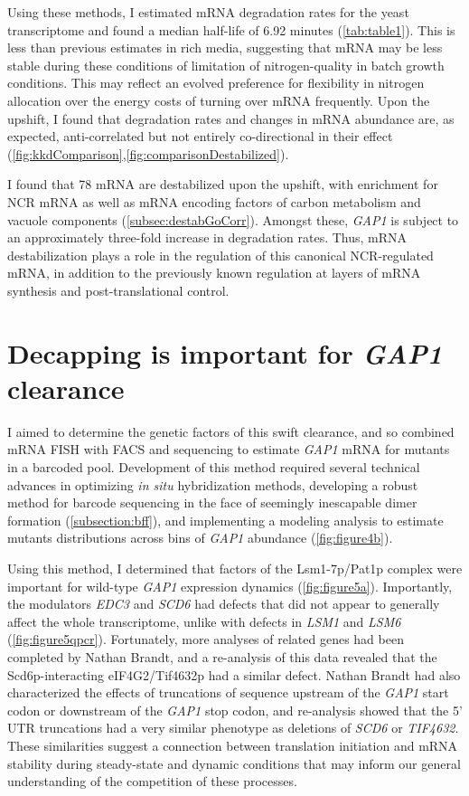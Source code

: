 Using these methods, I estimated mRNA degradation rates for the
yeast transcriptome and found a median half-life of 6.92 minutes
(\autoref{tab:table1}).
This is less than previous estimates in rich media, suggesting that
mRNA may be less stable during these conditions of limitation of
nitrogen-quality in batch growth conditions. This may reflect 
an evolved preference for flexibility in nitrogen allocation over
the energy costs of turning over mRNA frequently.
Upon the upshift,
I found that degradation rates and changes in
mRNA abundance are, as expected, anti-correlated but not entirely
co-directional in their effect
(\autoref{fig:kkdComparison},\autoref{fig:comparisonDestabilized}).

I found that 78 mRNA are destabilized upon the upshift, with
enrichment for NCR mRNA as well as mRNA encoding factors of carbon
metabolism and vacuole components (\autoref{subsec:destabGoCorr}). 
Amongst these, \textit{GAP1} is subject to an
approximately three-fold increase in degradation rates. 
Thus, mRNA destabilization plays a role in the regulation of this
canonical NCR-regulated mRNA, in addition to the previously known
regulation at layers of mRNA synthesis and post-translational
control.

\section{Decapping is important for \textit{GAP1} clearance}

I aimed to determine the genetic factors of this swift clearance, and
so combined mRNA FISH with FACS and sequencing to estimate
\textit{GAP1} mRNA for mutants in a barcoded pool. Development of this
method required several technical advances in optimizing 
\textit{in situ} hybridization methods, developing a robust method 
for barcode sequencing in the face of seemingly inescapable dimer 
formation (\autoref{subsection:bff}), and implementing a modeling
analysis to estimate mutants distributions across bins of 
\textit{GAP1} abundance (\autoref{fig:figure4b}). 

Using this method, I determined that factors of the Lsm1-7p/Pat1p
complex were important for wild-type \textit{GAP1} expression
dynamics (\autoref{fig:figure5a}). Importantly, the modulators
\textit{EDC3} and \textit{SCD6} had defects that did not appear
to generally affect the whole transcriptome, unlike with defects in
\textit{LSM1} and \textit{LSM6} (\autoref{fig:figure5qpcr}).
Fortunately, more analyses of related genes had been completed
by Nathan Brandt, and a re-analysis of this data revealed that 
the Scd6p-interacting eIF4G2/Tif4632p had a similar defect.
Nathan Brandt had also characterized the effects of truncations of
sequence upstream of the \textit{GAP1} start codon or downstream
of the \textit{GAP1} stop codon, and re-analysis showed that the 5'
UTR truncations had a very similar phenotype as deletions of
\textit{SCD6} or \textit{TIF4632}.
These similarities suggest a connection between translation initiation
and mRNA stability during steady-state and dynamic conditions that
may inform our general understanding of the competition of these 
processes.

